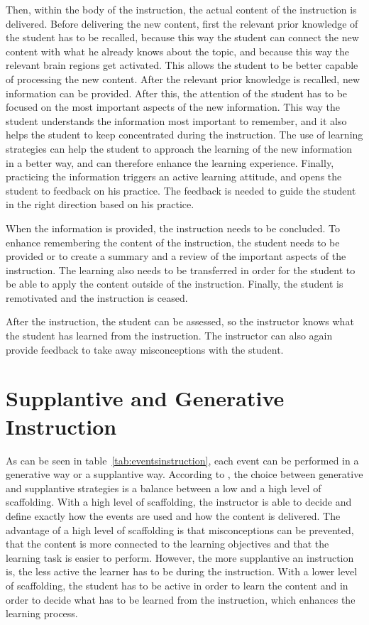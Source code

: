 \documentclass[11pt,twoside]{report} %
\begin{document}
Then, within the body of the instruction, the actual content of the instruction is delivered. Before delivering the new content, first the relevant prior knowledge of the student has to be recalled, because this way the student can connect the new content with what he already knows about the topic, and because this way the relevant brain regions get activated. This allows the student to be better capable of processing the new content. After the relevant prior knowledge is recalled, new information can be provided. After this, the attention of the student has to be focused on the most important aspects of the new information. This way the student understands the information most important to remember, and it also helps the student to keep concentrated during the instruction. The use of learning strategies can help the student to approach the learning of the new information in a better way, and can therefore enhance the learning experience. Finally, practicing the information triggers an active learning attitude, and opens the student to feedback on his practice. The feedback is needed to guide the student in the right direction based on his practice.

When the information is provided, the instruction needs to be concluded. To enhance remembering the content of the instruction, the student needs to be provided or to create a summary and a review of the important aspects of the instruction. The learning also needs to be transferred in order for the student to be able to apply the content outside of the instruction. Finally, the student is remotivated and the instruction is ceased.

After the instruction, the student can be assessed, so the instructor knows what the student has learned from the instruction. The instructor can also again provide feedback to take away misconceptions with the student.

\section{Supplantive and Generative Instruction}

As can be seen in table~\ref{tab:eventsinstruction}, each event can be performed in a generative way or a supplantive way. According to , the choice between generative and supplantive strategies is a balance between a low and a high level of scaffolding. With a high level of scaffolding, the instructor is able to decide and define exactly how the events are used and how the content is delivered. The advantage of a high level of scaffolding is that misconceptions can be prevented, that the content is more connected to the learning objectives and that the learning task is easier to perform. However, the more supplantive an instruction is, the less active the learner has to be during the instruction. With a lower level of scaffolding, the student has to be active in order to learn the content and in order to decide what has to be learned from the instruction, which enhances the learning process.
\end{document}

